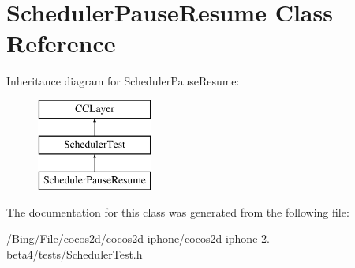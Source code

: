 \hypertarget{interface_scheduler_pause_resume}{\section{Scheduler\-Pause\-Resume Class Reference}
\label{interface_scheduler_pause_resume}
}
Inheritance diagram for Scheduler\-Pause\-Resume\-:\begin{figure}[H]
\begin{center}
\leavevmode
\includegraphics[height=3.000000cm]{interface_scheduler_pause_resume}
\end{center}
\end{figure}


The documentation for this class was generated from the following file\-:\begin{DoxyCompactItemize}
\item 
/\-Bing/\-File/cocos2d/cocos2d-\/iphone/cocos2d-\/iphone-\/2.-\/beta4/tests/Scheduler\-Test.\-h\end{DoxyCompactItemize}
